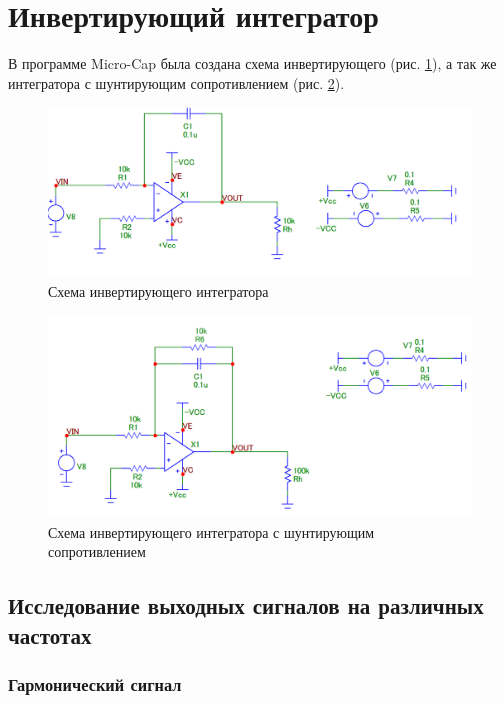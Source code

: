 \documentclass[a4paper,14pt]{article}
\begin{document}

\pagebreak
\section{Инвертирующий интегратор}

В программе Micro-Cap была создана схема инвертирующего (рис. \ref{fig:schema_int_base}), а так же интегратора с шунтирующим сопротивлением (рис. \ref{fig:schema_int}).

\begin{figure}[H]
	\centering
	\includegraphics[width=\linewidth]{../imgs/schema_int_base}
	\caption{Схема инвертирующего интегратора}
	\label{fig:schema_int_base}
\end{figure}

\begin{figure}[H]
	\centering
	\includegraphics[width=\linewidth]{../imgs/schema_int}
	\caption{Схема инвертирующего интегратора с шунтирующим сопротивлением}
	\label{fig:schema_int}
\end{figure}

\subsection{Исследование выходных сигналов на различных частотах}

\subsubsection{Гармонический сигнал}
\end{document}
